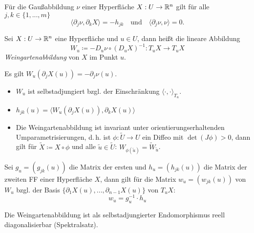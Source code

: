 \documentclass{cheat-sheet}
\begin{document}
\begin{satz}
  Für die Gaußabbildung $\nu$ einer Hyperfläche $X : U \to \mathbb{R}^n$ gilt für alle $j, k \in \{ 1, ..., m \}$
  \[ \langle \partial_j \nu , \partial_k X \rangle = - h_{jk} \quad \text{und} \quad \langle \partial_j \nu, \nu \rangle = 0. \]
\end{satz}

\begin{definition}
  Sei $X : U \to \mathbb{R}^n$ eine Hyperfläche und $u \in U$, dann heißt die lineare Abbildung
  \[ W_u \coloneqq - D_u \nu \circ (D_u X)^{-1} : T_u X \to T_u X \]
  \emph{Weingartenabbildung} von $X$ im Punkt $u$.
\end{definition}

\begin{bem}
  Es gilt $W_u(\partial_j X(u)) = - \partial_j \nu(u)$.
\end{bem}

\begin{satz}
  \begin{itemize}
    \item $W_u$ ist selbstadjungiert bzgl. der Einschränkung $\langle \cdot , \cdot \rangle_{T_u}$.
    \item $h_{jk}(u) = \langle W_u(\partial_j X(u)), \partial_k X(u) \rangle$
    \item Die Weingartenabbildung ist invariant unter orientierungserhaltenden Umparametrisierungen, d.\,h. ist $\phi : \tilde{U} \to U$ ein Diffeo mit $\det(J\phi) > 0$, dann gilt für $\tilde{X} \coloneqq X \circ \phi$ und alle $\tilde{u} \in \tilde{U}$: $W_{\phi(\tilde{u})} = \tilde{W}_{\tilde{u}}$.
  \end{itemize}
\end{satz}

\begin{satz}
  Sei $g_u = (g_{jk}(u))$ die Matrix der ersten und $h_u = (h_{jk}(u))$ die Matrix der zweiten FF einer Hyperfläche $X$, dann gilt für die Matrix $w_u = (w_{jk}(u))$ von $W_u$ bzgl. der Basis $\{ \partial_1 X(u), ..., \partial_{n-1} X(u) \}$ von $T_u X$:
  \[ w_u = g_u^{-1} \cdot h_u \]
\end{satz}

\begin{bem}
  Die Weingartenabbildung ist als selbstadjungierter Endomorphismus reell diagonalisierbar (Spektralsatz).
\end{bem}
\end{document}
